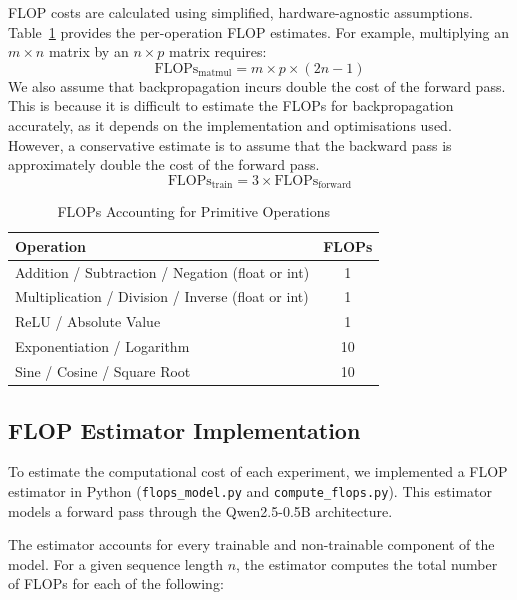 \documentclass[a4paper,12pt]{article}
\begin{document}
FLOP costs are calculated using simplified, hardware-agnostic assumptions. Table~\ref{tab:flops_primitives} provides the per-operation FLOP estimates. For example, multiplying an $m \times n$ matrix by an $n \times p$ matrix requires:
\begin{equation}
\text{FLOPs}_{\text{matmul}} = m \times p \times (2n - 1)
\end{equation}
We also assume that backpropagation incurs double the cost of the forward pass. This is because it is difficult to estimate the FLOPs for backpropagation accurately, as it depends on the implementation and optimisations used. However, a conservative estimate is to assume that the backward pass is approximately double the cost of the forward pass.
\begin{equation}
\text{FLOPs}_{\text{train}} = 3 \times \text{FLOPs}_{\text{forward}}
\end{equation}

\begin{table}[h]
  \centering
  \caption{FLOPs Accounting for Primitive Operations}
  \label{tab:flops_primitives}
  \begin{tabular}{lc}
    \hline
    Operation & FLOPs \\
    \hline
    Addition / Subtraction / Negation (float or int) & 1 \\
    Multiplication / Division / Inverse (float or int) & 1 \\
    ReLU / Absolute Value & 1 \\
    Exponentiation / Logarithm & 10 \\
    Sine / Cosine / Square Root & 10 \\
    \hline
  \end{tabular}
\end{table}

\subsection*{FLOP Estimator Implementation}

To estimate the computational cost of each experiment, we implemented a FLOP estimator in Python (\texttt{flops\_model.py} and \texttt{compute\_flops.py}). This estimator models a forward pass through the Qwen2.5-0.5B architecture.

The estimator accounts for every trainable and non-trainable component of the model. For a given sequence length $n$, the estimator computes the total number of FLOPs for each of the following:
\end{document}

